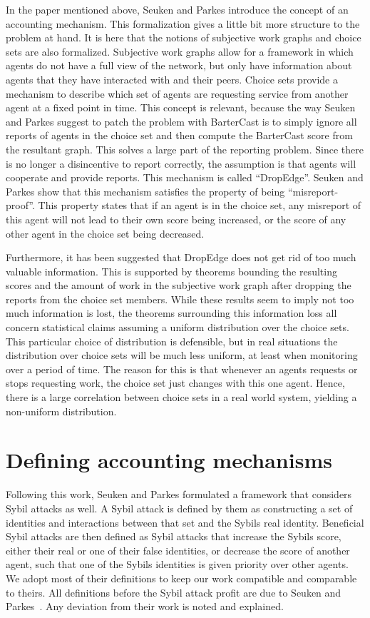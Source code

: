 \documentclass[a4paper,11pt]{book}
\theoremstyle{definition}
\begin{document}
In the paper mentioned above, Seuken and Parkes introduce the concept of an accounting mechanism. This formalization gives
a little bit more structure to the problem at hand. It is here that the notions of subjective work graphs
and choice sets are also formalized. Subjective work graphs allow for a framework in which agents
do not have a full view of the network, but only have information about agents that they have interacted
with and their peers. Choice sets provide a mechanism to describe which set of agents are requesting
service from another agent at a fixed point in time. 
This concept is relevant, because the way
Seuken and Parkes suggest to patch the problem with BarterCast is to simply ignore all reports of agents
in the choice set and then compute the BarterCast score from the resultant graph.
This solves a large part of the reporting problem. Since there is no longer a disincentive
to report correctly, the assumption is that agents will cooperate and provide reports.
This mechanism is called ``DropEdge''. Seuken and Parkes show that this mechanism satisfies the property
of being ``misreport-proof''. This property states that if an agent is in the choice set, 
any misreport of this agent will not lead to their own score being increased, or the score of
any other agent in the choice set being decreased.

Furthermore, it has been suggested that DropEdge does not get rid of too much valuable information.
This is supported by theorems bounding the resulting scores and the amount of work in the subjective
work graph after dropping the reports from the choice set members. While these results seem to imply
not too much information is lost, the theorems surrounding this information loss all concern statistical
claims assuming a uniform distribution over the choice sets. This particular choice of distribution is
defensible, but in real situations the distribution over choice sets will be much less uniform, at least
when monitoring over a period of time. The reason for this is that whenever an agents requests or
stops requesting work, the choice set just changes with this one agent. Hence, there is a large
correlation between choice sets in a real world system, yielding a non-uniform distribution.

\section{Defining accounting mechanisms}

Following this work, Seuken and Parkes \cite{seuken2014sybil} formulated a framework that considers Sybil attacks as well. 
A Sybil attack is defined by them as 
constructing a set of identities and interactions between that set and the Sybils real identity.
Beneficial Sybil attacks are then defined as Sybil attacks that increase the Sybils score, either their real or one of
their false identities, or decrease the score of another  agent, such that one of the Sybils identities
is given priority over other agents. We adopt most of their definitions to keep our work compatible and comparable to
theirs. All definitions before the Sybil attack profit are due to Seuken and Parkes~\cite{seuken2014sybil}. Any deviation
from their work is noted and explained.
\end{document}
